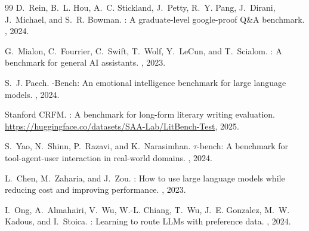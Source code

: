 \documentclass[11pt,a4paper]{article}
\begin{document}
\begin{thebibliography}{99}
D.~Rein, B.~L. Hou, A.~C. Stickland, J.~Petty, R.~Y. Pang, J.~Dirani, J.~Michael, and S.~R. Bowman.
: A graduate-level google-proof {Q}\&{A} benchmark.
, 2024.

G.~Mialon, C.~Fourrier, C.~Swift, T.~Wolf, Y.~LeCun, and T.~Scialom.
: A benchmark for general {AI} assistants.
, 2023.

S.~J. Paech.
-{Bench}: An emotional intelligence benchmark for large language models.
, 2024.

Stanford CRFM.
: A benchmark for long-form literary writing evaluation.
\newblock \url{https://huggingface.co/datasets/SAA-Lab/LitBench-Test}, 2025.

S.~Yao, N.~Shinn, P.~Razavi, and K.~Narasimhan.
\newblock $\tau$-bench: A benchmark for tool-agent-user interaction in real-world domains.
, 2024.

L.~Chen, M.~Zaharia, and J.~Zou.
: How to use large language models while reducing cost and improving performance.
, 2023.

I.~Ong, A.~Almahairi, V.~Wu, W.-L. Chiang, T.~Wu, J.~E. Gonzalez, M.~W. Kadous, and I.~Stoica.
: Learning to route {LLM}s with preference data.
, 2024.

\end{thebibliography}
\end{document}
